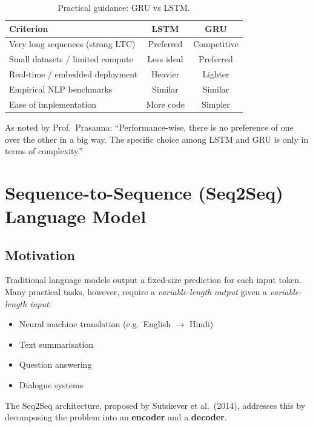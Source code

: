 \documentclass[12pt,a4paper]{article}
\begin{document}
\begin{table}[htbp]
\centering
\caption{Practical guidance: GRU vs LSTM.}
\label{tab:gru_vs_lstm}
\begin{tabular}{@{}lcc@{}}
\toprule
\textbf{Criterion} & \textbf{LSTM} & \textbf{GRU} \\
\midrule
Very long sequences (strong LTC) & Preferred & Competitive \\
Small datasets / limited compute & Less ideal & Preferred \\
Real-time / embedded deployment & Heavier & Lighter \\
Empirical NLP benchmarks & Similar & Similar \\
Ease of implementation & More code & Simpler \\
\bottomrule
\end{tabular}
\end{table}

As noted by Prof.\ Prasanna: ``Performance-wise, there is no preference of one over the other in a
big way. The specific choice among LSTM and GRU is only in terms of complexity.''

\section{Sequence-to-Sequence (Seq2Seq) Language Model}
\label{sec:seq2seq}

\subsection{Motivation}

Traditional language models output a fixed-size prediction for each input token.  Many practical
tasks, however, require a \emph{variable-length output} given a \emph{variable-length input}:
\begin{itemize}[noitemsep]
  \item Neural machine translation (e.g.\ English $\to$ Hindi)
  \item Text summarisation
  \item Question answering
  \item Dialogue systems
\end{itemize}
The Seq2Seq architecture, proposed by Sutskever et al.\ (2014), addresses this by decomposing
the problem into an \textbf{encoder} and a \textbf{decoder}.
\end{document}
